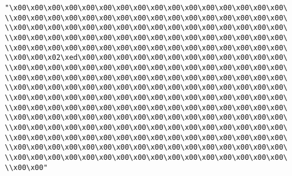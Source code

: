 \verb|"\x00\x00\x00\x00\x00\x00\x00\x00\x00\x00\x00\x00\x00\x00\x00\x00\|\newline
\verb|\\x00\x00\x00\x00\x00\x00\x00\x00\x00\x00\x00\x00\x00\x00\x00\x00\|\newline
\verb|\\x00\x00\x00\x00\x00\x00\x00\x00\x00\x00\x00\x00\x00\x00\x00\x00\|\newline
\verb|\\x00\x00\x00\x00\x00\x00\x00\x00\x00\x00\x00\x00\x00\x00\x00\x00\|\newline
\verb|\\x00\x00\x00\x00\x00\x00\x00\x00\x00\x00\x00\x00\x00\x00\x00\x00\|\newline
\verb|\\x00\x00\x02\xed\x00\x00\x00\x00\x00\x00\x00\x00\x00\x00\x00\x00\|\newline
\verb|\\x00\x00\x00\x00\x00\x00\x00\x00\x00\x00\x00\x00\x00\x00\x00\x00\|\newline
\verb|\\x00\x00\x00\x00\x00\x00\x00\x00\x00\x00\x00\x00\x00\x00\x00\x00\|\newline
\verb|\\x00\x00\x00\x00\x00\x00\x00\x00\x00\x00\x00\x00\x00\x00\x00\x00\|\newline
\verb|\\x00\x00\x00\x00\x00\x00\x00\x00\x00\x00\x00\x00\x00\x00\x00\x00\|\newline
\verb|\\x00\x00\x00\x00\x00\x00\x00\x00\x00\x00\x00\x00\x00\x00\x00\x00\|\newline
\verb|\\x00\x00\x00\x00\x00\x00\x00\x00\x00\x00\x00\x00\x00\x00\x00\x00\|\newline
\verb|\\x00\x00\x00\x00\x00\x00\x00\x00\x00\x00\x00\x00\x00\x00\x00\x00\|\newline
\verb|\\x00\x00\x00\x00\x00\x00\x00\x00\x00\x00\x00\x00\x00\x00\x00\x00\|\newline
\verb|\\x00\x00\x00\x00\x00\x00\x00\x00\x00\x00\x00\x00\x00\x00\x00\x00\|\newline
\verb|\\x00\x00\x00\x00\x00\x00\x00\x00\x00\x00\x00\x00\x00\x00\x00\x00\|\newline
\verb|\\x00\x00"|\newline
